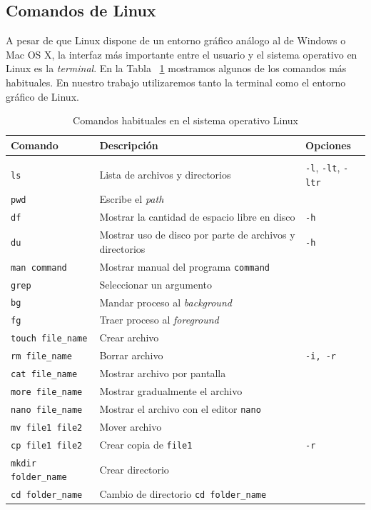 \documentclass{tufte-book}
\begin{document}
\subsection{Comandos de Linux}
A pesar de que Linux dispone de un entorno gráfico análogo al de 
Windows o Mac OS X, la interfaz más importante entre el usuario y el 
sistema operativo en Linux es la \textit{terminal}. En la Tabla~
\ref{tb:commands} mostramos algunos de los comandos más habituales.
En nuestro trabajo utilizaremos tanto la terminal como el entorno
gráfico de Linux.

\begin{table}[h!]
\centering
	\scriptsize
	\begin{tabular}{l|l|l}
		Comando & Descripción & Opciones \\
		\hline
		& & \\
		\texttt{ls} & Lista de archivos y directorios & \texttt{-l}, \texttt{-lt}, \texttt{-ltr} \\ 
		\texttt{pwd} & Escribe el \textit{path} & \\ 
		\texttt{df} & Mostrar la cantidad de espacio libre en disco & \texttt{-h}\\ 
		\texttt{du} & Mostrar uso de disco por parte de archivos y directorios & \texttt{-h}\\
		\texttt{man command} & Mostrar manual del programa \texttt{command}  & \texttt{}\\ 
		\texttt{grep} & Seleccionar un argumento  & \texttt{}\\

		\texttt{bg} & Mandar proceso al \textit{background}  & \texttt{}\\ 
		\texttt{fg} & Traer proceso al \textit{foreground}  & \texttt{}\\ 
		\texttt{touch file\_name} & Crear archivo  & \\ 
		\texttt{rm file\_name} & Borrar archivo  & \texttt{-i, -r}\\ 
		\texttt{cat file\_name} & Mostrar archivo por pantalla & \\ 
		\texttt{more file\_name} & Mostrar gradualmente el archivo & \texttt{}\\ 
		\texttt{nano file\_name} & Mostrar el archivo con el editor \texttt{nano}  & \\ 
		\texttt{mv file1 file2} & Mover archivo  & \\ 
		\texttt{cp file1 file2} & Crear copia de \texttt{file1}  & \texttt{-r}\\ 
		\texttt{mkdir folder\_name} & Crear directorio  & \\ 
		\texttt{cd folder\_name} & Cambio de directorio \texttt{cd folder\_name}& \texttt{}\\ 
    \end{tabular}
    \caption{Comandos habituales en el sistema operativo Linux}
    \label{tb:commands}
\end{table}
\end{document}
